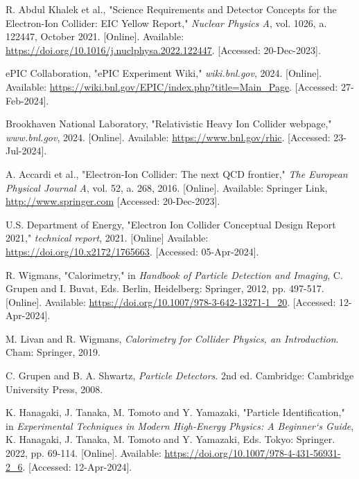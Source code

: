 \begin{thebibliography}{60}

     R. Abdul Khalek et al., "Science Requirements and Detector Concepts for the Electron-Ion Collider: EIC Yellow Report," \textit{Nuclear Physics A}, vol. 1026, a. 122447, October 2021. [Online]. Available: \url{https://doi.org/10.1016/j.nuclphysa.2022.122447}. [Accessed: 20-Dec-2023].

     ePIC Collaboration, "ePIC Experiment Wiki," \textit{wiki.bnl.gov}, 2024. [Online]. Available: \url{https://wiki.bnl.gov/EPIC/index.php?title=Main_Page}. [Accessed: 27-Feb-2024].

     Brookhaven National Laboratory, "Relativistic Heavy Ion Collider webpage," \textit{www.bnl.gov}, 2024. [Online]. Available: \url{https://www.bnl.gov/rhic}. [Accessed: 23-Jul-2024].

     A. Accardi et al., "Electron-Ion Collider: The next QCD frontier," \textit{The European Physical Journal A}, vol. 52, a. 268, 2016. [Online]. Available: Springer Link, \url{http://www.springer.com} [Accessed: 20-Dec-2023].

     U.S. Department of Energy, "Electron Ion Collider Conceptual Design Report 2021," \textit{technical report}, 2021. [Online] Available: \url{https://doi.org/10.x2172/1765663}. [Accessed: 05-Apr-2024].

     R. Wigmans, "Calorimetry," in \textit{Handbook of Particle Detection and Imaging}, C. Grupen and I. Buvat, Eds. Berlin, Heidelberg: Springer, 2012, pp. 497-517. [Online]. Available: \url{https://doi.org/10.1007/978-3-642-13271-1_20}. [Accessed: 12-Apr-2024].

     M. Livan and R. Wigmans, \textit{Calorimetry for Collider Physics, an Introduction}. Cham: Springer, 2019. 

     C. Grupen and B. A. Shwartz, \textit{Particle Detectors}. 2nd ed. Cambridge: Cambridge University Press, 2008.

     K. Hanagaki, J. Tanaka, M. Tomoto and Y. Yamazaki, "Particle Identification," in \textit{Experimental Techniques in Modern High-Energy Physics: A Beginner‘s Guide}, K. Hanagaki, J. Tanaka, M. Tomoto and Y. Yamazaki, Eds. Tokyo: Springer. 2022, pp. 69-114. [Online]. Available: \url{ https://doi.org/10.1007/978-4-431-56931-2_6}. [Accessed: 12-Apr-2024].


\end{thebibliography}
